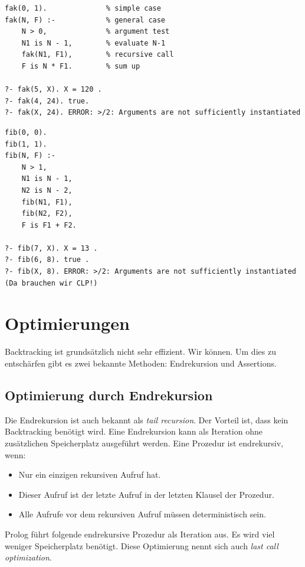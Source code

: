 \begin{lstlisting}[caption=Fakultät]
fak(0, 1). 				% simple case
fak(N, F) :- 			% general case
	N > 0, 				% argument test
	N1 is N - 1, 		% evaluate N-1
	fak(N1, F1), 		% recursive call
	F is N * F1. 		% sum up

?- fak(5, X). X = 120 .
?- fak(4, 24). true.
?- fak(X, 24). ERROR: >/2: Arguments are not sufficiently instantiated
\end{lstlisting}

\begin{lstlisting}[caption=Fibonacci, label=lst:naiv-fib]
% Naive Implementierung! Optimierung mittels Endrekursion und Assertions.
fib(0, 0).
fib(1, 1).
fib(N, F) :-
	N > 1,
	N1 is N - 1,
	N2 is N - 2,
	fib(N1, F1),
	fib(N2, F2),
	F is F1 + F2.

?- fib(7, X). X = 13 .
?- fib(6, 8). true .
?- fib(X, 8). ERROR: >/2: Arguments are not sufficiently instantiated (Da brauchen wir CLP!)
\end{lstlisting}

\section{Optimierungen}

Backtracking ist grundsätzlich nicht sehr effizient. Wir können. Um dies zu entschärfen gibt es zwei bekannte Methoden: Endrekursion und Assertions.

\subsection{Optimierung durch Endrekursion}
Die Endrekursion ist auch bekannt als \emph{tail recursion}. Der Vorteil ist, dass kein Backtracking benötigt wird. Eine Endrekursion kann als Iteration ohne zusätzlichen Speicherplatz ausgeführt werden. Eine Prozedur ist endrekursiv, wenn:

\begin{itemize}
	\item Nur ein einzigen rekursiven Aufruf hat.
	\item Dieser Aufruf ist der letzte Aufruf in der letzten Klausel der Prozedur.
	\item Alle Aufrufe vor dem rekursiven Aufruf müssen deterministisch sein.
\end{itemize}

Prolog führt folgende endrekursive Prozedur als Iteration aus. Es wird viel weniger Speicherplatz benötigt. Diese Optimierung nennt sich auch \emph{last call optimization}.

